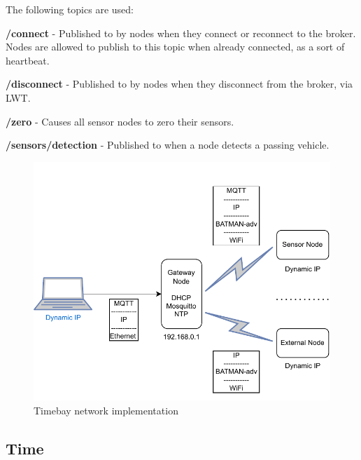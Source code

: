 \documentclass[journal]{IEEEtran}
\begin{document}
The following topics are used:

\textbf{/connect} - Published to by nodes when they connect or reconnect to the broker. Nodes are allowed to publish to this topic when already connected, as a sort of heartbeat.

\textbf{/disconnect} - Published to by nodes when they disconnect from the broker, via LWT.

\textbf{/zero} - Causes all sensor nodes to zero their sensors.

\textbf{/sensors/detection} - Published to when a node detects a passing vehicle.

\begin{figure}[t]
    \centering
    \includegraphics[width=\linewidth]{images/network_info.drawio.pdf}
    \caption{Timebay network implementation}
    \label{fig:network_impl}
\end{figure}
\subsection{Time}
\end{document}
